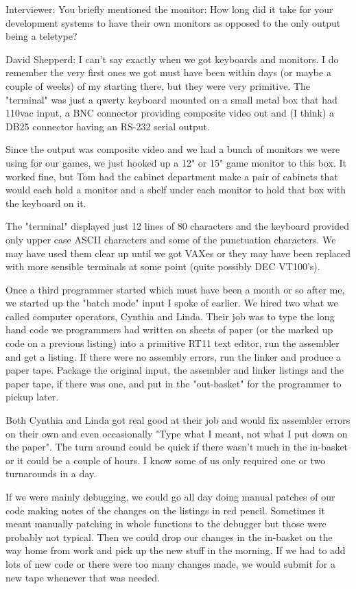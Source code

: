 \textcolor{interviewer}{Interviewer:} You briefly mentioned the monitor: How long did it take for your development systems to have their own monitors as opposed to the only output being a teletype?

\textcolor{interviewee}{David Shepperd:} I can't say exactly when we got keyboards and monitors. I do remember the very first ones we got must have been within days (or maybe a couple of weeks) of my starting there, but they were very primitive. The "terminal" was just a qwerty keyboard mounted on a small metal box that had 110vac input, a BNC connector providing composite video out and (I think) a DB25 connector having an RS-232 serial output. 

Since the output was composite video and we had a bunch of monitors we were using for our games, we just hooked up a 12" or 15" game monitor to this box. It worked fine, but Tom had the cabinet department make a pair of cabinets that would each hold a monitor and a shelf under each monitor to hold that box with the keyboard on it. 

The "terminal" displayed just 12 lines of 80 characters and the keyboard provided only upper case ASCII characters and some of the punctuation characters. We may have used them clear up until we got VAXes or they may have been replaced with more sensible terminals at some point (quite possibly DEC VT100's).

Once a third programmer started which must have been a month or so after me, we started up the "batch mode" input I spoke of earlier. We hired two what we called computer operators, Cynthia and Linda. Their job was to type the long hand code we programmers had written on sheets of paper (or the marked up code on a previous listing) into a primitive RT11 text editor, run the assembler and get a listing. If there were no assembly errors, run the linker and produce a paper tape. Package the original input, the assembler and linker listings and the paper tape, if there was one, and put in the "out-basket" for the programmer to pickup later. 

Both Cynthia and Linda got real good at their job and would fix assembler errors on their own and even occasionally "Type what I meant, not what I put down on the paper". The turn around could be quick if there wasn't much in the in-basket or it could be a couple of hours. I know some of us only required one or two turnarounds in a day. 

If we were mainly debugging, we could go all day doing manual patches of our code making notes of the changes on the listings in red pencil. Sometimes it meant manually patching in whole functions to the debugger but those were probably not typical. Then we could drop our changes in the in-basket on the way home from work and pick up the new stuff in the morning. If we had to add lots of new code or there were too many changes made, we would submit for a new tape whenever that was needed.

